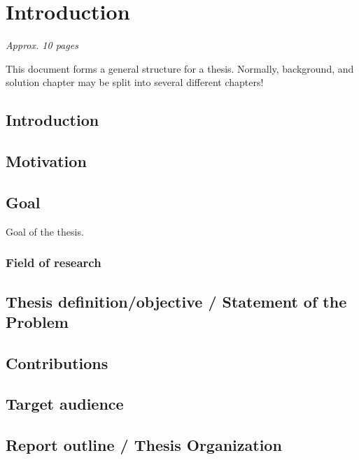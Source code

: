 \chapter{Introduction}
\label{ch:introduction}

\textit{Approx. 10 pages}

This document forms a general structure for a thesis.
Normally, background, and solution chapter may be split into several different chapters!

\section{Introduction}

\section{Motivation}

\section{Goal}
Goal of the thesis.

\subsection{Field of research}

\section{Thesis definition/objective / Statement of the Problem}

\section{Contributions}
 
\section{Target audience}


\section{Report outline / Thesis Organization}
